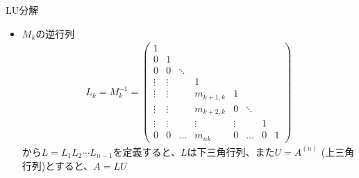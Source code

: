 \begin{frame}[t,fragile]{LU分解}
  \begin{itemize}
    \setlength{\itemsep}{1em}
  \item $M_k$の逆行列
    \begin{align*}
      L_k = M_k^{-1} = 
      \begin{pmatrix}
        1 & \\
        0 & 1 \\
        0 & 0 & \ddots \\
        \vdots & \vdots & & 1 \\
        \vdots & \vdots & & m_{k+1,k} & 1 & \\
        \vdots & \vdots & & m_{k+2,k} & 0 & \ddots \\
        \vdots & \vdots & & \vdots & \vdots & & 1 & \\
        0 & 0 & \hdots & m_{nk} & 0 & \hdots & 0 & 1
      \end{pmatrix}
    \end{align*}
    から$L=L_1L_2\cdots L_{n-1}$を定義すると、$L$は下三角行列、また$U = A^{(n)}$ (上三角行列)とすると、$A = LU$
  \end{itemize}
\end{frame}
